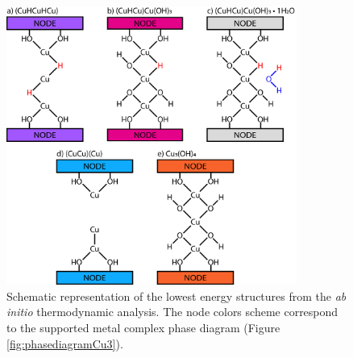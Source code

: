 \documentclass[journal=jctcce,manuscript=article]{achemso}
\begin{document}
\begin{figure}[H]
    \centering
    \includegraphics[width=0.85\textwidth]{zi-images/02-Cu-Graphics/2020-08-04-structure-diagram-Cu3OH4-V01-IMAGE.png}
    \caption{Schematic representation of the lowest energy structures from the \textit{ab initio} thermodynamic analysis. The node colors scheme correspond to the  supported metal complex phase diagram (Figure \ref{fig:phasediagramCu3}).}
    \label{fig:structurediagramCu3}
\end{figure}
\end{document}
